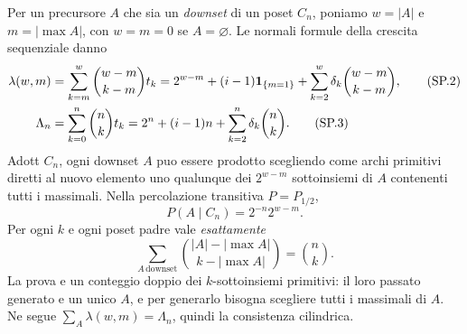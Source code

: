 \documentclass[11pt,a4paper]{article}
\begin{document}
Per un precursore $A$ che sia un \emph{downset} di un poset $C_n$, poniamo $w=|A|$ e $m=|\max A|$, con $w=m=0$ se $A=\varnothing$. Le normali formule della crescita sequenziale danno
\begin{align}
\lambda(w,m)&=\sum_{k=m}^{w}\binom{w-m}{k-m}t_k
=2^{w-m}+(i-1){\bf1}_{\{m=1\}}+\sum_{k=2}^{w}\delta_k\binom{w-m}{k-m},\tag{SP.2}\\
\Lambda_n&=\sum_{k=0}^{n}\binom nk t_k
=2^n+(i-1)n+\sum_{k=2}^{n}\delta_k\binom nk.\tag{SP.3}
\end{align}
Adott $C_n$, ogni downset $A$ puo essere prodotto scegliendo come archi primitivi diretti al nuovo elemento uno qualunque dei $2^{w-m}$ sottoinsiemi di $A$ contenenti tutti i massimali. Nella percolazione transitiva $P=P_{1/2}$,
\begin{equation}
P(A\mid C_n)=2^{-n}2^{w-m}.\tag{SP.4}
\end{equation}
Per ogni $k$ e ogni poset padre vale \emph{esattamente}
\begin{equation}
\boxed{\ \sum_{A\,\mathrm{downset}}\binom{|A|-|\max A|}{k-|\max A|}=\binom nk.\ }
\tag{SP.5}
\end{equation}
La prova e un conteggio doppio dei $k$-sottoinsiemi primitivi: il loro passato generato e un unico $A$, e per generarlo bisogna scegliere tutti i massimali di $A$. Ne segue $\sum_A\lambda(w,m)=\Lambda_n$, quindi la consistenza cilindrica.

\clearpage
\end{document}
